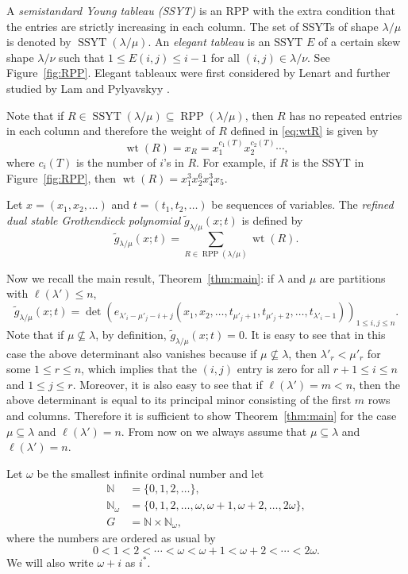 \documentclass{amsart}
\numberwithin{equation}{section}
\theoremstyle{definition}
\newcommand\NN{\mathbb{N}}
\newcommand\RPP{\operatorname{RPP}}
\newcommand\SSYT{\operatorname{SSYT}}
\newcommand\lm{{\lambda/\mu}}
\renewcommand\gg{\widetilde{g}}
\newcommand\wt{\operatorname{wt}}
\begin{document}
A \emph{semistandard Young tableau (SSYT)} is an RPP with the extra condition
that the entries are strictly increasing in each column. The set of SSYTs of
shape $\lm$ is denoted by $\SSYT(\lm)$. An \emph{elegant tableau} is an SSYT $E$
of a certain skew shape $\lambda/\nu$ such that $1\le E(i,j)\le i-1$ for all
$(i,j)\in \lambda/\nu$. See Figure~\ref{fig:RPP}. Elegant tableaux were first
considered by Lenart \cite[Theorem~2.7]{Lenart2000} and further studied by Lam
and Pylyavskyy \cite{LP2007}.



Note that if $R\in\SSYT(\lm)\subseteq\RPP(\lm)$, then $R$ has no repeated
entries in each column and therefore the weight of $R$ defined in \eqref{eq:wtR}
is given by
\[
  \wt(R) = x_R=x_1^{c_1(T)}x_2^{c_2(T)}\cdots,
\]
where $c_i(T)$ is the number of $i$'s in $R$. For example, if $R$ is the SSYT in
Figure~\ref{fig:RPP}, then $\wt(R)=x_1^3x_2^6x_4^3x_5$.

Let $x=(x_1,x_2,\dots)$ and $t=(t_1,t_2,\dots)$ be sequences of variables. The
\emph{refined dual stable Grothendieck polynomial} $\gg_{\lm}(x;t)$ is defined
by
\[
  \gg_{\lambda/\mu}(x;t) = \sum_{R\in\RPP(\lm)} \wt(R).
\]

Now we recall the main result, Theorem~\ref{thm:main}: if $\lambda$ and $\mu$
are partitions with $\ell(\lambda')\le n$,
\[
  \widetilde{g}_{\lambda/\mu}(x;t) = \det
  \left( e_{\lambda'_i-\mu'_j-i+j}
    (x_1,x_2,\dots,t_{\mu'_j+1},t_{\mu'_j+2},\dots,t_{\lambda'_i-1})
  \right)_{1\le i,j\le n}.
\]
Note that if $\mu\not\subseteq\lambda$, by definition,
$\gg_{\lambda/\mu}(x;t)=0$. It is easy to see that in this case the above
determinant also vanishes because if $\mu\not\subseteq\lambda$, then
$\lambda'_r<\mu'_r$ for some $1\le r\le n$, which implies that the $(i,j)$ entry
is zero for all $r+1\le i\le n$ and $1\le j\le r$. Moreover, it is also easy to
see that if $\ell(\lambda')=m<n$, then the above determinant is equal to its
principal minor consisting of the first $m$ rows and columns. Therefore it is
sufficient to show Theorem~\ref{thm:main} for the case $\mu\subseteq\lambda$ and
$\ell(\lambda')=n$. From now on we always assume that $\mu\subseteq\lambda$ and
$\ell(\lambda')=n$.





Let $\omega$ be the smallest infinite ordinal number and let
\begin{align*}
  \NN &= \{0,1,2,\dots\},\\
  \NN_\omega &= \{0,1,2,\dots,\omega,\omega+1,\omega+2,\dots,2\omega\},\\
  G &= \NN\times\NN_\omega,
\end{align*}
where the numbers are ordered as usual by
\[
0<1<2<\cdots<\omega<\omega+1<\omega+2<\cdots<2\omega.
\]
We will also write $\omega+i$ as $i^*$.
\end{document}
